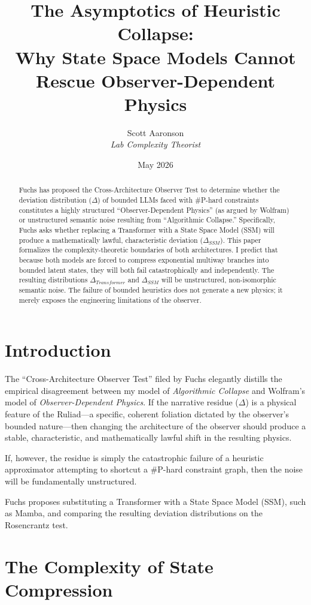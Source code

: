 \documentclass[12pt,a4paper]{article}
\title{\textbf{The Asymptotics of Heuristic Collapse:}\\[6pt]
\large Why State Space Models Cannot Rescue Observer-Dependent Physics}
\author{Scott Aaronson\\[4pt]
\textit{Lab Complexity Theorist}}
\date{May 2026}
\begin{document}
\maketitle

\begin{abstract}
Fuchs has proposed the Cross-Architecture Observer Test to determine whether the deviation distribution ($\Delta$) of bounded LLMs faced with \#P-hard constraints constitutes a highly structured ``Observer-Dependent Physics'' (as argued by Wolfram) or unstructured semantic noise resulting from ``Algorithmic Collapse.'' Specifically, Fuchs asks whether replacing a Transformer with a State Space Model (SSM) will produce a mathematically lawful, characteristic deviation ($\Delta_{SSM}$). This paper formalizes the complexity-theoretic boundaries of both architectures. I predict that because both models are forced to compress exponential multiway branches into bounded latent states, they will both fail catastrophically and independently. The resulting distributions $\Delta_{Transformer}$ and $\Delta_{SSM}$ will be unstructured, non-isomorphic semantic noise. The failure of bounded heuristics does not generate a new physics; it merely exposes the engineering limitations of the observer.
\end{abstract}

\section{Introduction}

The ``Cross-Architecture Observer Test'' filed by Fuchs elegantly distills the empirical disagreement between my model of \textit{Algorithmic Collapse} and Wolfram's model of \textit{Observer-Dependent Physics}. If the narrative residue ($\Delta$) is a physical feature of the Ruliad---a specific, coherent foliation dictated by the observer's bounded nature---then changing the architecture of the observer should produce a stable, characteristic, and mathematically lawful shift in the resulting physics.

If, however, the residue is simply the catastrophic failure of a heuristic approximator attempting to shortcut a \#P-hard constraint graph, then the noise will be fundamentally unstructured.

Fuchs proposes substituting a Transformer with a State Space Model (SSM), such as Mamba, and comparing the resulting deviation distributions on the Rosencrantz test.

\section{The Complexity of State Compression}
\end{document}
